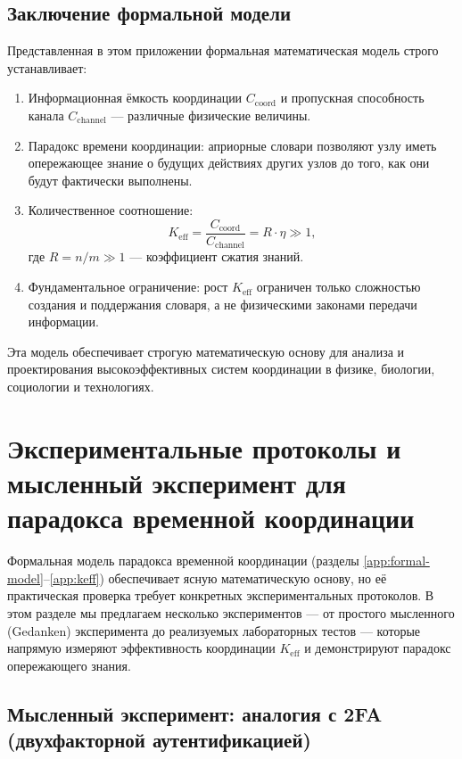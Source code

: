 \documentclass[12pt]{article}
\begin{document}
	\subsection{Заключение формальной модели}
	
	Представленная в этом приложении формальная математическая модель строго устанавливает:
	
	\begin{enumerate}
		\item Информационная ёмкость координации $C_{\text{coord}}$ и пропускная способность канала $C_{\text{channel}}$ — различные физические величины.
		
		\item Парадокс времени координации: априорные словари позволяют узлу иметь опережающее знание о будущих действиях других узлов до того, как они будут фактически выполнены.
		
		\item Количественное соотношение:
		\[
		K_{\mathrm{eff}} = \frac{C_{\text{coord}}}{C_{\text{channel}}} = R \cdot \eta \gg 1,
		\]
		где $R = n/m \gg 1$ — коэффициент сжатия знаний.
		
		\item Фундаментальное ограничение: рост $K_{\mathrm{eff}}$ ограничен только сложностью создания и поддержания словаря, а не физическими законами передачи информации.
	\end{enumerate}
	
	Эта модель обеспечивает строгую математическую основу для анализа и проектирования высокоэффективных систем координации в физике, биологии, социологии и технологиях.
	
	
	\section{Экспериментальные протоколы и мысленный эксперимент для парадокса временной координации}
	\label{app:experimental-protocols}
	
	Формальная модель парадокса временной координации (разделы \ref{app:formal-model}--\ref{app:keff}) обеспечивает ясную математическую основу, но её практическая проверка требует конкретных экспериментальных протоколов. В этом разделе мы предлагаем несколько экспериментов — от простого мысленного (Gedanken) эксперимента до реализуемых лабораторных тестов — которые напрямую измеряют эффективность координации \(K_{\mathrm{eff}}\) и демонстрируют парадокс опережающего знания.
	
	\subsection{Мысленный эксперимент: аналогия с 2FA (двухфакторной аутентификацией)}
	\label{subsec:thought-2fa}
	
\end{document}
